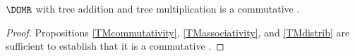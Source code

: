 \begin{corollary}\label{ItsARingHarry}
  $\DOMR$ with tree addition and tree multiplication is a commutative \rng.
  \begin{proof}
    Propositions \ref{TMcommutativity}, \ref{TMassociativity}, and
    \ref{TMdistrib} are sufficient to establish that it is a commutative
    \rng.
  \end{proof}
\end{corollary}
























